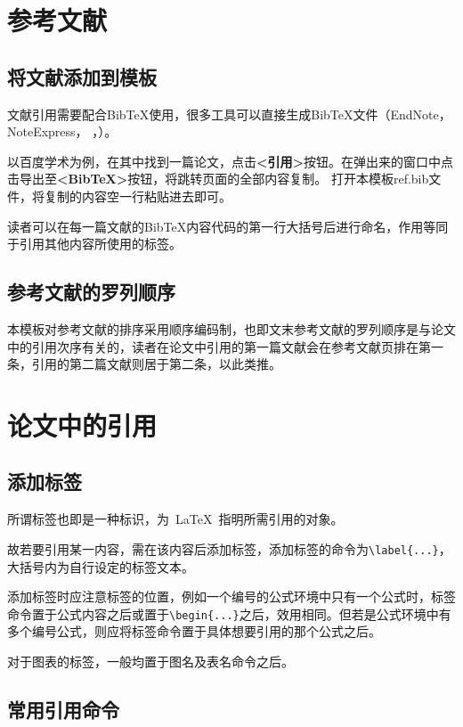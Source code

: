 \section{参考文献}

\subsection{将文献添加到模板}

文献引用需要配合BibTeX使用，很多工具可以直接生成BibTeX文件（EndNote， NoteExpress， ，）。\par 以百度学术为例，在其中找到一篇论文，点击\textbf{<引用>}按钮。在弹出来的窗口中点击导出至\textbf{<BibTeX>}按钮，将跳转页面的全部内容复制。 打开本模板ref.bib文件，将复制的内容空一行粘贴进去即可。

读者可以在每一篇文献的BibTeX内容代码的第一行大括号后进行命名，作用等同于引用其他内容所使用的标签。

\subsection{参考文献的罗列顺序}

本模板对参考文献的排序采用顺序编码制，也即文末参考文献的罗列顺序是与论文中的引用次序有关的，读者在论文中引用的第一篇文献会在参考文献页排在第一条，引用的第二篇文献则居于第二条，以此类推。

\section{论文中的引用}

\subsection{添加标签}

所谓标签也即是一种标识，为~\LaTeX~指明所需引用的对象。

故若要引用某一内容，需在该内容后添加标签，添加标签的命令为\verb|\label{...}|，大括号内为自行设定的标签文本。

添加标签时应注意标签的位置，例如一个编号的公式环境中只有一个公式时，标签命令置于公式内容之后或置于\verb|\begin{...}|之后，效用相同。但若是公式环境中有多个编号公式，则应将标签命令置于具体想要引用的那个公式之后。

对于图表的标签，一般均置于图名及表名命令之后。

\subsection{常用引用命令}

